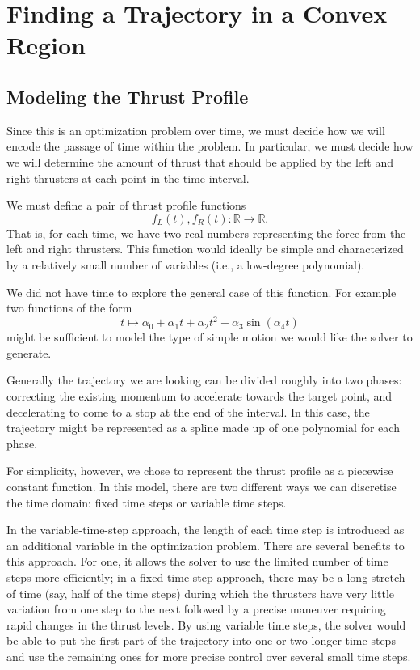 \documentclass{report}
\begin{document}

\chapter{Finding a Trajectory in a Convex Region}
\section{Modeling the Thrust Profile}
Since this is an optimization problem over time, we must decide how we will encode
the passage of time within the problem. In particular, we must decide how we will
determine the amount of thrust that should be applied by the left and right thrusters
at each point in the time interval.

We must define a pair of thrust profile functions
\[ f_L(t), f_R(t) : \mathbb{R} \to \mathbb{R}. \]
That is, for each time, we have two real numbers representing the force from the left and right
thrusters.
This function would ideally be simple and characterized by a relatively small number of variables (i.e.,
a low-degree polynomial).

We did not have time to explore the general case of this function. For example two functions of the form
\[ t \mapsto \alpha_0 + \alpha_1 t + \alpha_2 t^2 + \alpha_3 \sin(\alpha_4 t) \]
might be sufficient to model the type of simple motion we would like the solver to generate.

Generally the trajectory we are looking can be divided roughly into
two phases: correcting the existing momentum to accelerate towards the target point, and 
decelerating to come to a stop at the end of the interval. In this case, the trajectory
might be represented as a spline made up of one polynomial for each phase.

For simplicity, however, we chose to represent the thrust profile as a piecewise constant
function. In this model, there are two different ways we can discretise the time domain:
fixed time steps or variable time steps.

In the variable-time-step approach, the length of each time step is introduced as an additional
variable in the optimization problem. There are several benefits to this approach.
For one, it allows the solver to use the limited number of time steps more efficiently; in a
fixed-time-step approach, there may be a long stretch of time (say, half of the time steps)
during which the thrusters have very little variation from one step to the next followed by a
precise maneuver requiring rapid changes in the thrust levels. By using variable time steps,
the solver would be able to put the first part of the trajectory into one or two longer time steps
and use the remaining ones for more precise control over several small time steps.
\end{document}
